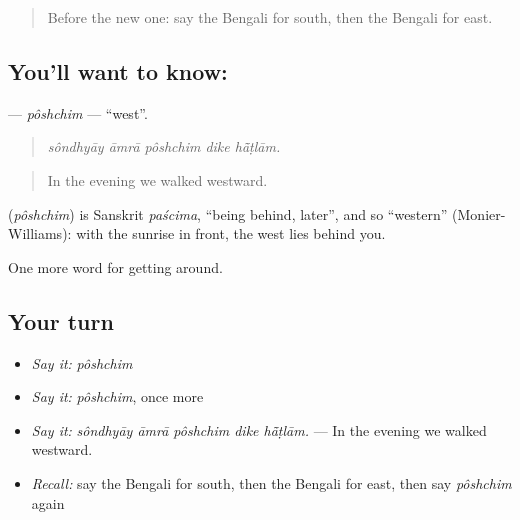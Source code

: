 \label{lesson:BN-C401-poshchim}



\begin{quote}
Before the new one: say the Bengali for south, then the Bengali for east.
\end{quote}

\subsection*{You'll want to know: }
\textbf{} — \emph{pôshchim} — \textquotedblleft{}west\textquotedblright{}.

\begin{quote}
    
\end{quote}

\begin{quote}
\emph{sôndhyāy āmrā pôshchim dike hā̃ṭlām.}
\end{quote}

\begin{quote}
In the evening we walked westward.
\end{quote}

\begin{cousinweb}
\textbf{} (\emph{pôshchim}) is Sanskrit \emph{paścima}, \textquotedblleft{}being behind, later\textquotedblright{}, and so \textquotedblleft{}western\textquotedblright{} (Monier-Williams): with the sunrise in front, the west lies behind you.
\end{cousinweb}

\begin{grammarlens}[title={What you've built}]
One more word for getting around.
\end{grammarlens}

\subsection*{Your turn}
\begin{itemize}
\raggedright
  \item \emph{Say it:} \emph{pôshchim}
  \item \emph{Say it:} \emph{pôshchim}, once more
  \item \emph{Say it:} \emph{sôndhyāy āmrā pôshchim dike hā̃ṭlām.} — In the evening we walked westward.
  \item \emph{Recall:} say the Bengali for south, then the Bengali for east, then say \emph{pôshchim} again
\end{itemize}

